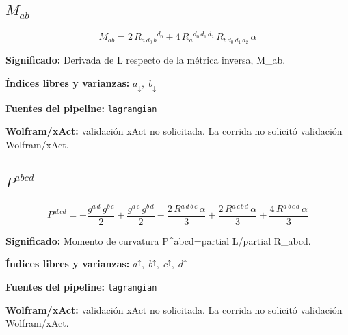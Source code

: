 \documentclass[11pt]{article}
\begin{document}
\subsection*{$ M_{ab} $}
\begin{dmath*}[breakdepth={5}]
M_{ab} = 2\,R{}_{a\,d_{0}\,b}{}^{d_{0}} + 4\,R{}_{a}{}^{d_{0}\,d_{1}\,d_{2}}\,R{}_{b\,d_{0}\,d_{1}\,d_{2}}\,\alpha
\end{dmath*}
\par\vspace{1.2\baselineskip}\noindent
\begin{minipage}{\linewidth}
\textbf{Significado:} Derivada de L respecto de la métrica inversa, M\_ab.\par
\textbf{Índices libres y varianzas:} $ a_{\downarrow},\;b_{\downarrow} $\par
\textbf{Fuentes del pipeline:} \texttt{lagrangian}\par
\textbf{Wolfram/xAct:} validación xAct no solicitada. La corrida no solicitó validación Wolfram/xAct.\par
\end{minipage}
\subsection*{$ P^{abcd} $}
\begin{dmath*}[breakdepth={5}]
P^{abcd} = -\frac{g{}^{a\,d}\,g{}^{b\,c}}{2} + \frac{g{}^{a\,c}\,g{}^{b\,d}}{2} - \frac{2\,R{}^{a\,d\,b\,c}\,\alpha}{3} + \frac{2\,R{}^{a\,c\,b\,d}\,\alpha}{3} + \frac{4\,R{}^{a\,b\,c\,d}\,\alpha}{3}
\end{dmath*}
\par\vspace{1.2\baselineskip}\noindent
\begin{minipage}{\linewidth}
\textbf{Significado:} Momento de curvatura P^{abcd}=partial L/partial R\_abcd.\par
\textbf{Índices libres y varianzas:} $ a^{\uparrow},\;b^{\uparrow},\;c^{\uparrow},\;d^{\uparrow} $\par
\textbf{Fuentes del pipeline:} \texttt{lagrangian}\par
\textbf{Wolfram/xAct:} validación xAct no solicitada. La corrida no solicitó validación Wolfram/xAct.\par
\end{minipage}
\end{document}
